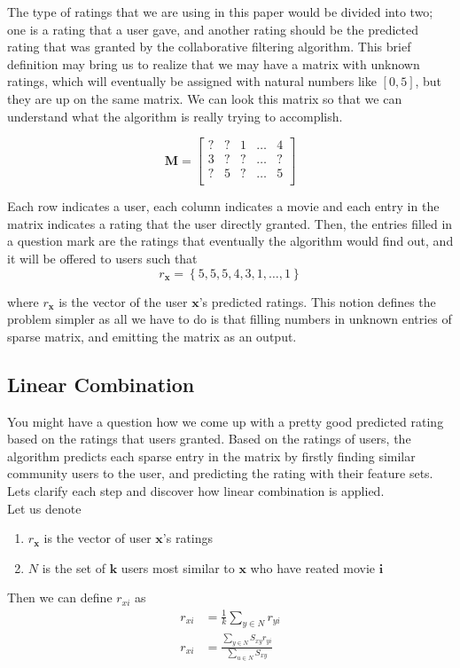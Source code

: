 \documentclass[paper=letter, fontsize=12pt]{scrartcl} %
\numberwithin{equation}{section} %
\numberwithin{figure}{section} %
\numberwithin{table}{section} %
\newcommand{\matxxx}[3] {
\begin{bmatrix}
  #1 \\
  #2 \\
  #3 \\
\end{bmatrix}
}
\begin{document}
  The type of ratings that we are using in this paper would be divided into two;
  one is a rating that a user gave, and another rating should be the
  predicted rating that was granted by the collaborative filtering algorithm. This
  brief definition may bring us to realize that we may have a matrix with unknown
  ratings, which will eventually be assigned with natural numbers like \([0,5]\), but
  they are up on the same matrix. We can look this matrix so that we can
  understand what the algorithm is really trying to accomplish.

	\[
		\mathbf{M} =
		\matxxx
		{? & ? & 1 & \dots & 4}
		{3 & ? & ? & \dots & ?}
		{? & 5 & ? & \dots & 5}
	\]

  Each row indicates a user, each column indicates a movie and each entry in the
  matrix indicates a rating that the user directly granted. Then, the entries
  filled in a question mark are the ratings that eventually the algorithm would
  find out, and it will be offered to users such that
  \[
    r_{\mathbf{x}} = \left\{5,5,5,4,3,1,\dots,1\right\}
  \]

  where \(r_\mathbf{x}\) is the vector of the user \(\mathbf{x}\)'s predicted ratings. This
  notion defines the problem simpler as all we have to do is that filling
  numbers in unknown entries of sparse matrix, and emitting the matrix as an
  output.

  \subsection{Linear Combination}

  You might have a question how we come up with a pretty good predicted rating
  based on the ratings that users granted. Based on the ratings of users, the
  algorithm predicts each sparse entry in the matrix by firstly finding similar community users to the user, and predicting the rating with their feature sets. Lets clarify each step and discover how linear combination is applied.\\

  Let us denote
  \begin{enumerate}
  \item \(r_{\mathbf{x}}\) is the vector of user \(\mathbf{x}\)'s ratings
  \item \(N\) is the set of \(\mathbf{k}\) users most similar to \(\mathbf{x}\)
    who have reated movie \(\mathbf{i}\)
  \end{enumerate}

  Then we can define \(r_{xi}\) as
  \[
    \begin{split}
      r_{xi} & = \frac{1}{k} \sum_{y \in N} r_{yi} \\
      r_{xi} & = \frac{\sum_{y \in N} S_{xy} r_{yi}}{\sum_{u \in N} S_{xy}}
    \end{split}
  \]
\end{document}
